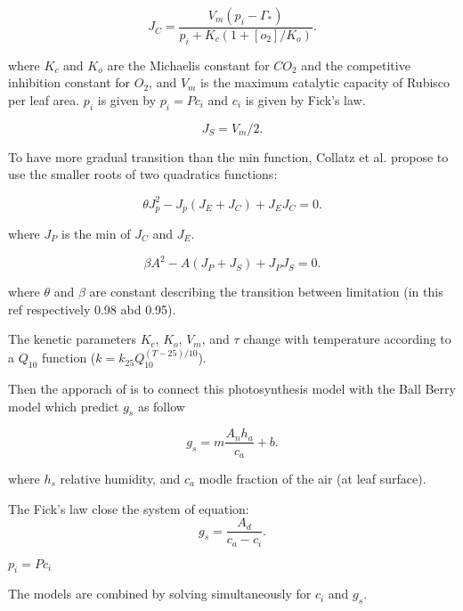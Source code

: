 \documentclass[a4paper,11pt]{article}
\begin{document}
\begin{equation}
\label{eq:JE}
J_C= \frac{V_m (p_i - \Gamma_*)}{p_i + K_c (1+[o_2]/K_o)}.
\end{equation}

where $K_c$ and $K_o$ are the Michaelis constant for $CO_2$ and the competitive inhibition constant for $O_2$, and $V_m$ is the maximum catalytic capacity of Rubisco per leaf area.
$p_i$ is given by $p_i = P c_i$ and $c_i$ is given by Fick's law.

\begin{equation}
\label{eq:JS}
J_S= V_m/2.
\end{equation}

To have more gradual transition than the min function, Collatz et al. propose to use the smaller roots of two quadratics functions:

\begin{equation}
\label{eq:Q1}
\theta J_p^2 - J_p(J_E+J_C) + J_E J_C= 0.
\end{equation}

where $J_P$ is the min of $J_C$ and $J_E$.

\begin{equation}
\label{eq:Q2}
\beta A^2 - A(J_P+J_S) + J_P J_S= 0.
\end{equation}

where $\theta$ and $\beta$ are constant describing the transition between limitation (in this ref respectively 0.98 abd 0.95).

The kenetic parameters $K_c$, $K_o$, $V_m$, and $\tau$ change with temperature according to a $Q_{10}$ function ($k = k_{25} Q_{10}^{(T-25)/10}$).

Then the apporach of \citet{Collatz-1991} is to connect this photosynthesis model with the Ball Berry model which predict $g_s$  as follow

\begin{equation}
\label{eq:gs}
g_s= m \frac{A_n h_a}{c_a}+b.
\end{equation}

where $h_s$ relative humidity, and $c_a$ modle fraction of the air (at leaf surface).

The Fick's law close the system of equation:
\begin{equation}
\label{eq:fick}
g_s=\frac{A_d}{c_a - c_i}.
\end{equation}

$p_i = P c_i$

The models are combined by solving simultaneously for $c_i$ and $g_s$.
\end{document}
